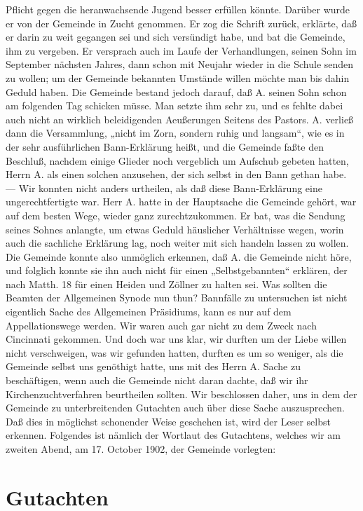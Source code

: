 Pflicht gegen die heranwachsende Jugend besser erfüllen könnte. Darüber wurde er von der Gemeinde in Zucht genommen. Er zog die Schrift zurück, erklärte, daß er darin zu weit gegangen sei und sich versündigt habe, und bat die Gemeinde, ihm zu vergeben. Er versprach auch im Laufe der Verhandlungen, seinen Sohn im September nächsten Jahres, dann schon mit Neujahr wieder in die Schule senden zu wollen; um der Gemeinde bekannten Umstände willen möchte man bis dahin Geduld haben. Die Gemeinde bestand jedoch darauf, daß A. seinen Sohn schon am folgenden Tag schicken müsse. Man setzte ihm sehr zu, und es fehlte dabei auch nicht an wirklich beleidigenden Aeußerungen Seitens des Pastors. A. verließ dann die Versammlung, „nicht im Zorn, sondern ruhig und langsam“, wie es in der sehr ausführlichen Bann-Erklärung heißt, und die Gemeinde faßte den Beschluß, nachdem einige Glieder noch vergeblich um Aufschub gebeten hatten, Herrn A. als einen solchen anzusehen, der sich selbst in den Bann gethan habe. — Wir konnten nicht anders urtheilen, als daß diese Bann-Erklärung eine ungerechtfertigte war. Herr A. hatte in der Hauptsache die Gemeinde gehört, war auf dem besten Wege, wieder ganz zurechtzukommen. Er bat, was die Sendung seines Sohnes anlangte, um etwas Geduld häuslicher Verhältnisse wegen, worin auch die sachliche Erklärung lag, noch weiter mit sich handeln lassen zu wollen. Die Gemeinde konnte also unmöglich erkennen, daß A. die Gemeinde nicht höre, und folglich konnte sie ihn auch nicht für einen „Selbstgebannten“ erklären, der nach Matth. 18 für einen Heiden und Zöllner zu halten sei. Was sollten die Beamten der Allgemeinen Synode nun thun? Bannfälle zu untersuchen ist nicht eigentlich Sache des Allgemeinen Präsidiums, kann es nur auf dem Appellationswege werden. Wir waren auch gar nicht zu dem Zweck nach Cincinnati gekommen. Und doch war uns klar, wir durften um der Liebe willen nicht verschweigen, was wir gefunden hatten, durften es um so weniger, als die Gemeinde selbst uns genöthigt hatte, uns mit des Herrn A. Sache zu beschäftigen, wenn auch die Gemeinde nicht daran dachte, daß wir ihr Kirchenzuchtverfahren beurtheilen sollten. Wir beschlossen daher, uns in dem der Gemeinde zu unterbreitenden Gutachten auch über diese Sache auszusprechen. Daß dies in möglichst schonender Weise geschehen ist, wird der Leser selbst erkennen. Folgendes ist nämlich der Wortlaut des Gutachtens, welches wir am zweiten Abend, am 17. October 1902, der Gemeinde vorlegten:

\section{Gutachten}


